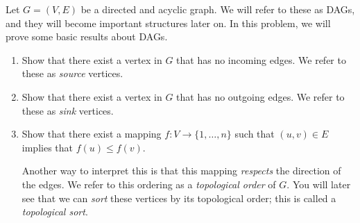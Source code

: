 \documentclass{article}
\begin{document}
\begin{question}
Let $G = (V, E)$ be a directed and acyclic graph. We will refer to these as DAGs, and they will become important structures later on. In this problem, we will prove some basic results about DAGs.

\begin{enumerate}[label = (\alph*)]
    \item Show that there exist a vertex in $G$ that has no incoming edges. We refer to these as {\em source} vertices.

    \item Show that there exist a vertex in $G$ that has no outgoing edges. We refer to these as {\em sink} vertices.

    \item \label{topsort} Show that there exist a mapping $f : V \to \{1, \dots, n\}$ such that $(u, v) \in E$ implies that $f(u) \leq f(v)$.

    Another way to interpret this is that this mapping {\em respects} the direction of the edges. We refer to this ordering as a {\em topological order} of $G$. You will later see that we can {\em sort} these vertices by its topological order; this is called a {\em topological sort}.
\end{enumerate}
\end{question}
\end{document}
